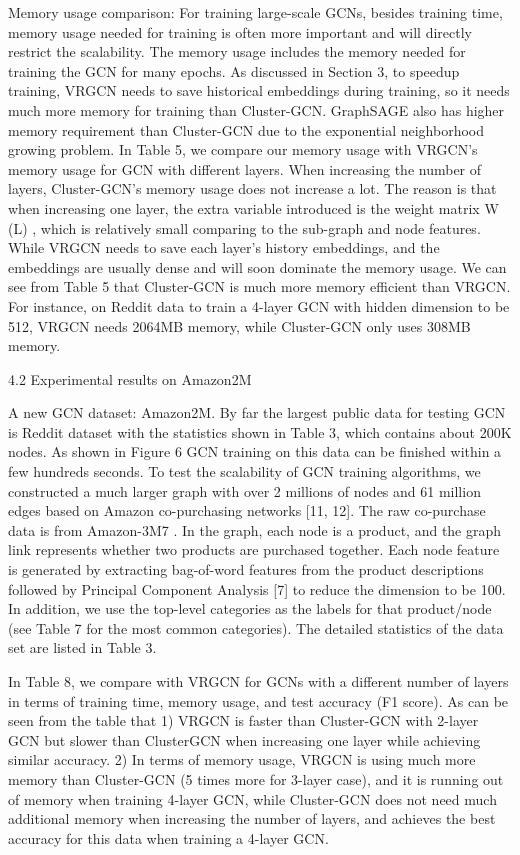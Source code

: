 \documentclass[
]{book}
\begin{document}
{{{Memory usage comparison: For training large-scale GCNs, besides training time, memory usage needed for training is often more important and will directly restrict the scalability. The memory usage includes the memory needed for training the GCN for many epochs. As discussed in Section 3, to speedup training, VRGCN needs to save historical embeddings during training, so it needs much more memory for training than Cluster-GCN. GraphSAGE also has higher memory requirement than Cluster-GCN due to the exponential neighborhood growing problem. In Table 5, we compare our memory usage with VRGCN's memory usage for GCN with different layers. When increasing the number of layers, Cluster-GCN's memory usage does not increase a lot. The reason is that when increasing one layer, the extra variable introduced is the weight matrix W (L) , which is relatively small comparing to the sub-graph and node features. While VRGCN needs to save each layer's history embeddings, and the embeddings are usually dense and will soon dominate the memory usage. We can see from Table 5 that Cluster-GCN is much more memory efficient than VRGCN. For instance, on Reddit data to train a 4-layer GCN with hidden dimension to be 512, VRGCN needs 2064MB memory, while Cluster-GCN only uses 308MB memory.

4.2 Experimental results on Amazon2M

A new GCN dataset: Amazon2M. By far the largest public data for testing GCN is Reddit dataset with the statistics shown in Table 3, which contains about 200K nodes. As shown in Figure 6 GCN training on this data can be finished within a few hundreds seconds. To test the scalability of GCN training algorithms, we constructed a much larger graph with over 2 millions of nodes and 61 million edges based on Amazon co-purchasing networks {[}11, 12{]}. The raw co-purchase data is from Amazon-3M7 . In the graph, each node is a product, and the graph link represents whether two products are purchased together. Each node feature is generated by extracting bag-of-word features from the product descriptions followed by Principal Component Analysis {[}7{]} to reduce the dimension to be 100. In addition, we use the top-level categories as the labels for that product/node (see Table 7 for the most common categories). The detailed statistics of the data set are listed in Table 3.

In Table 8, we compare with VRGCN for GCNs with a different number of layers in terms of training time, memory usage, and test accuracy (F1 score). As can be seen from the table that 1) VRGCN is faster than Cluster-GCN with 2-layer GCN but slower than ClusterGCN when increasing one layer while achieving similar accuracy. 2) In terms of memory usage, VRGCN is using much more memory than Cluster-GCN (5 times more for 3-layer case), and it is running out of memory when training 4-layer GCN, while Cluster-GCN does not need much additional memory when increasing the number of layers, and achieves the best accuracy for this data when training a 4-layer GCN.

}}}
\end{document}
